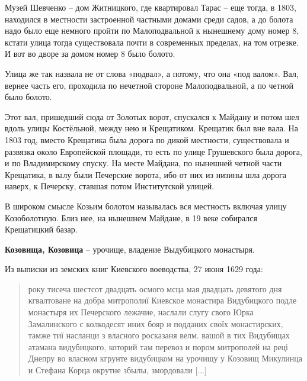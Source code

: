 Музей Шевченко – дом Житницкого, где квартировал Тарас – еще тогда, в 1803, находился в местности застроенной частными домами среди садов, а до болота надо было еще немного пройти по Малоподвальной к нынешнему дому номер 8, кстати улица тогда существовала почти в современных пределах, на том отрезке. И вот во дворе за домом номер 8 было болото.

Улица же так назвала не от слова «подвал», а потому, что она «под валом». Вал, вернее часть его, проходила по нечетной стороне Малоподвальной, а по четной было болото. 

Этот вал, пришедший сюда от Золотых ворот, спускался к Майдану и потом шел вдоль улицы Костёльной, между нею и Крещатиком. Крещатик был вне вала. На 1803 год, вместо Крещатика была дорога по дикой местности, существовала и развязка около Европейской площади, то есть по улице Грушевского была дорога, и по Владимирскому спуску. На месте Майдана, по нынешней четной части Крещатика, в валу были Печерские ворота, ибо от них из низины шла дорога наверх, к Печерску, ставшая потом Институтской улицей.

В широком смысле Козьим болотом называлась вся местность включая улицу Козоболотную. Близ нее, на нынешнем Майдане, в 19 веке собирался Крещатицкий базар.\\

\medskip



\textbf{Козовища, Козовица} – урочище, владение Выдубицкого монастыря.

Из выписки из земских книг Киевского воеводства, 27 июня 1629 года:

\begin{quotation}
року тисеча шестсот двадцать осмого мсца мая двадцать девятого дня кгвалтоване на добра митрополиї Киевское монастира Видубицкого подле монастыря их Печерского лежачие, наслали слугу свого Юрка Замалинского с колкодесят иних бояр и подданих своїх монастирских, тамже тиї насланци з власного росказаня велм. вашой в тих Видубищах атамана видубицкого, которий там перевоз и пором митрополей на реці Днепру во власном кгрунте видубицком на урочищу у Козовищ Микулинца и Стефана Корца окрутне збылы, змордовали [...] 
\end{quotation}


